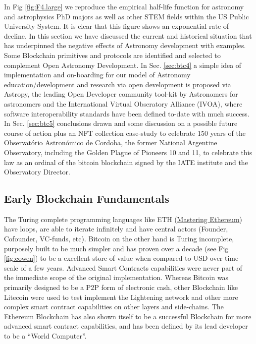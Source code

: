 \documentclass[final,5p,times,twocolumn,authoryear]{elsarticle}
\begin{document}
In Fig \ref{fig:F4.large} we reproduce the empirical half-life function for astronomy and astrophysics PhD majors as well as other STEM fields within the US Public University System. It is clear that this figure shows an exponential rate of decline.  In this section we have discussed the current and historical situation that has underpinned the negative effects of Astronomy development with examples. Some Blockchain primitives and protocols are identified and selected to complement Open Astronomy Development.  In Sec. \ref{sec:btc4} a simple idea of implementation and on-boarding for our model of Astronomy education/development and research via open development is proposed via Astropy, the leading Open Developer community tool-kit by Astronomers for astronomers and the International Virtual Obseratory Alliance (IVOA), where software interoperability standards have been defined to-date with much success. In Sec. \ref{sec:btc5} conclusions drawn and some discussion on a possible future course of action plus an NFT collection case-study to celebrate 150 years of the Observat\'orio Astron\'omico de Cordoba, the former National Argentine Observatory, including the Golden Plague of Pioneers 10 and 11, to celebrate this law as an ordinal of the bitcoin blockchain signed by the IATE institute and the Observatory Director. 

\subsection{Early Blockchain Fundamentals}
\label{subsec:fundamentals}

The Turing complete programming languages like ETH (\href{https://github.com/ethereumbook/ethereumbook#readme}{Mastering Ethereum}) have loops, are able to iterate infinitely and have central actors (Founder, Cofounder, VC-funds, etc). Bitcoin on the other hand is Turing incomplete, purposely built to be much simpler and has proven over a decade (see Fig \ref{fig:cowen}) to be a excellent store of value when compared to USD over time-scale of a few years. Advanced Smart Contracts capabilities were never part of the immediate scope of the original implementation. Whereas Bitcoin was primarily designed to be a P2P form of electronic cash, other Blockchain like Litecoin were used to test implement the Lightening network and other more complex smart contract capabilities on other layers and side-chains. The Ethereum Blockchain has also shown itself to be a successful Blockchain for more advanced smart contract capabilities, and has been defined by its lead developer to be a “World Computer”. 
 
\end{document}
